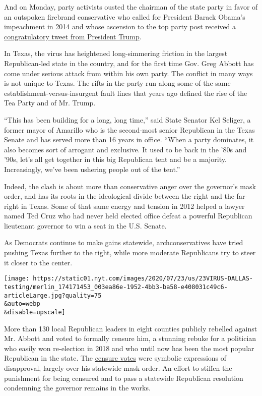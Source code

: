 And on Monday, party activists ousted the chairman of the state party in
favor of an outspoken firebrand conservative who called for President
Barack Obama's impeachment in 2014 and whose ascension to the top party
post received a
\href{https://twitter.com/realdonaldtrump/status/1285196013020610562}{congratulatory
tweet from President Trump}.

In Texas, the virus has heightened long-simmering friction in the
largest Republican-led state in the country, and for the first time Gov.
Greg Abbott has come under serious attack from within his own party. The
conflict in many ways is not unique to Texas. The rifts in the party run
along some of the same establishment-versus-insurgent fault lines that
years ago defined the rise of the Tea Party and of Mr. Trump.

``This has been building for a long, long time,'' said State Senator Kel
Seliger, a former mayor of Amarillo who is the second-most senior
Republican in the Texas Senate and has served more than 16 years in
office. ``When a party dominates, it also becomes sort of arrogant and
exclusive. It used to be back in the '80s and '90s, let's all get
together in this big Republican tent and be a majority. Increasingly,
we've been ushering people out of the tent.''

Indeed, the clash is about more than conservative anger over the
governor's mask order, and has its roots in the ideological divide
between the right and the far-right in Texas. Some of that same energy
and tension in 2012 helped a lawyer named Ted Cruz who had never held
elected office defeat a powerful Republican lieutenant governor to win a
seat in the U.S. Senate.

As Democrats continue to make gains statewide, archconservatives have
tried pushing Texas further to the right, while more moderate
Republicans try to steer it closer to the center.

\texttt{[image: https://static01.nyt.com/images/2020/07/23/us/23VIRUS-DALLAS-testing/merlin\_174171453\_003ea86e-1952-4bb3-ba58-e408031c49c6-articleLarge.jpg?quality=75\\\&auto=webp\\\&disable=upscale]}

More than 130 local Republican leaders in eight counties publicly
rebelled against Mr. Abbott and voted to formally censure him, a
stunning rebuke for a politician who easily won re-election in 2018 and
who until now has been the most popular Republican in the state. The
\href{https://www.facebook.com/EctorCountyGOP/posts/3251377961614048}{censure
votes} were symbolic expressions of disapproval, largely over his
statewide mask order. An effort to stiffen the punishment for being
censured and to pass a statewide Republican resolution condemning the
governor remains in the works.


